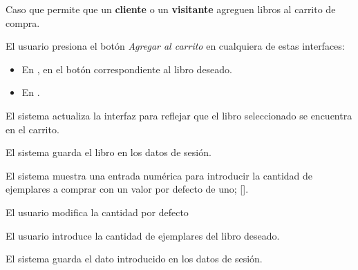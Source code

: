 %
%

{
  Caso que permite que un \textbf{cliente} o un \textbf{visitante} agreguen
  libros al carrito de compra.

  \begin{trayectoriaPrincipal}

    \item El usuario presiona el botón \textit{Agregar al carrito} en
      cualquiera de estas interfaces:
      \begin{itemize}
        \item En , en el botón correspondiente
          al libro deseado.
        \item En .
      \end{itemize}

      \item El sistema actualiza la interfaz para reflejar que el libro
        seleccionado se encuentra en el carrito.

      \item El sistema guarda el libro en los datos de sesión.

      \item El sistema muestra una entrada numérica para introducir la cantidad
        de ejemplares a comprar con un valor por defecto de uno;
        [].

  \end{trayectoriaPrincipal}


  \begin{trayectoriaAlternativa}
    {El usuario modifica la cantidad por defecto}

    \item El usuario introduce la cantidad de ejemplares del libro deseado.

    \item El sistema guarda el dato introducido en los datos de sesión.

  \end{trayectoriaAlternativa}
}
